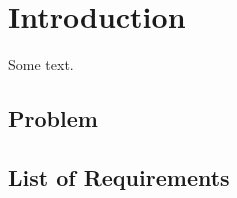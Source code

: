 \chapter{Introduction}
\label{chap:intro}
	Some text.

	\section{Problem}
	\section{List of Requirements}
